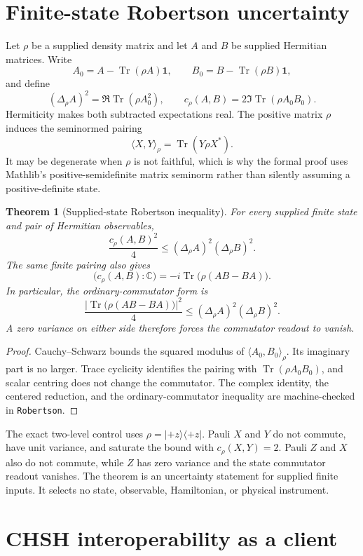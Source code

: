 \documentclass[11pt]{article}
\renewcommand{\_}{\textunderscore\allowbreak}
\newtheorem{theorem}{Theorem}
\theoremstyle{remark}
\newcommand{\Tr}{\operatorname{Tr}}
\newcommand{\one}{\mathbf 1}
\begin{document}
\section{Finite-state Robertson uncertainty}
\label{sec:robertson}

Let $\rho$ be a supplied density matrix and let $A$ and $B$ be supplied
Hermitian matrices. Write
\[
 A_0=A-\Tr(\rho A)\one,
 \qquad
 B_0=B-\Tr(\rho B)\one,
\]
and define
\[
 (\Delta_\rho A)^2=\Re\Tr(\rho A_0^2),
 \qquad
 c_\rho(A,B)=2\Im\Tr(\rho A_0B_0).
\]
Hermiticity makes both subtracted expectations real. The positive matrix
$\rho$ induces the seminormed pairing
\[
 \langle X,Y\rangle_\rho=\Tr(Y\rho X^*).
\]
It may be degenerate when $\rho$ is not faithful, which is why the formal
proof uses Mathlib's positive-semidefinite matrix seminorm rather than
silently assuming a positive-definite state.

\begin{theorem}[Supplied-state Robertson inequality]
\label{thm:finite-robertson}
For every supplied finite state and pair of Hermitian observables,
\[
 \frac{c_\rho(A,B)^2}{4}
 \le (\Delta_\rho A)^2(\Delta_\rho B)^2.
\]
The same finite pairing also gives
\[
 \bigl(c_\rho(A,B):\mathbb C\bigr)=
 -i\Tr\bigl(\rho(AB-BA)\bigr).
\]
In particular, the ordinary-commutator form is
\[
 \frac{\left|\Tr\bigl(\rho(AB-BA)\bigr)\right|^2}{4}
 \le (\Delta_\rho A)^2(\Delta_\rho B)^2.
\]
A zero variance on either side therefore forces the commutator readout to
vanish.
\end{theorem}

\begin{proof}
Cauchy--Schwarz bounds the squared modulus of
$\langle A_0,B_0\rangle_\rho$. Its imaginary part is no larger. Trace
cyclicity identifies the pairing with $\Tr(\rho A_0B_0)$, and scalar centring
does not change the commutator. The complex identity, the centered reduction,
and the ordinary-commutator inequality are machine-checked in
\texttt{Robertson}.
\end{proof}

The exact two-level control uses $\rho=|{+z}\rangle\langle{+z}|$.
Pauli $X$ and $Y$ do not commute, have unit variance, and saturate the bound
with $c_\rho(X,Y)=2$. Pauli $Z$ and $X$ also do not commute, while $Z$ has
zero variance and the state commutator readout vanishes. The theorem is an
uncertainty statement for supplied finite inputs. It selects no state,
observable, Hamiltonian, or physical instrument.

\section{CHSH interoperability as a client}
\label{sec:chsh}
\end{document}
